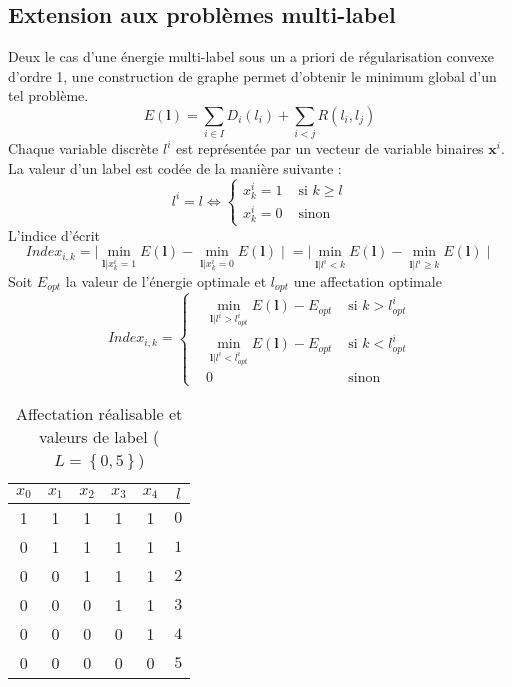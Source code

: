 \documentclass[../main/These_Mathias_Paget.tex]{subfiles}
\begin{document}
\subsection{Extension aux problèmes multi-label}

Deux le cas d'une énergie multi-label sous un a priori de régularisation convexe d'ordre 1, une construction de graphe permet d'obtenir le minimum global d'un tel problème.
	\begin{equation}
		\label{eq:Emulti}
				E(\boldsymbol{l})= \sum_{i \in I}{D_i(l_i)} + \sum_{i<j}{R(l_i,l_j)}
	\end{equation}
Chaque variable discrète $l^i$ est représentée par un vecteur de variable binaires $\boldsymbol{x}^i$. La valeur d'un label est codée de la manière suivante :
\begin{equation}
  l^i = l \Leftrightarrow \left\{
      \begin{aligned}
	x^i_k = 1 & \text{ si } k \geq l \\
	x^i_k = 0 & \text{ sinon}
      \end{aligned}
    \right.
\end{equation}
L'indice d'écrit
\begin{equation}
Index_{i,k} =  \mid \min_{\boldsymbol{l} | x^i_k =1}{E(\boldsymbol{l})} - \min_{\boldsymbol{l} | x^i_k =0}{E(\boldsymbol{l}) \mid} = \mid \min_{\boldsymbol{l} | l^i < k}{E(\boldsymbol{l})} - \min_{\boldsymbol{l} | l^i \geq k }{E(\boldsymbol{l}) \mid}
\end{equation}
Soit $E_{opt}$ la valeur de l’énergie optimale et $l_{opt}$ une affectation optimale
\begin{equation}
Index_{i,k} =  \left\{
      \begin{aligned}
	& \min_{\boldsymbol{l} | l^i > l^i_{opt}}{E(\boldsymbol{l})} - E_{opt} & \text{ si } k > l^i_{opt} \\
	& \min_{\boldsymbol{l} | l^i < l^i_{opt}}{E(\boldsymbol{l})} - E_{opt} & \text{ si } k < l^i_{opt} \\
	& 0 & \text{ sinon}
      \end{aligned}
    \right.
\end{equation}


\begin{table}
\centering
\begin{tabular}{ccccc|c}
	$x_0$ & $x_1$ & $x_2$ & $x_3$ & $x_4$ & $l$ \\
	\hline
	1 & 1 & 1 & 1 & 1 & $0$ \\
	0 & 1 & 1 & 1 & 1 & $1$ \\
	0 & 0 & 1 & 1 & 1 & $2$ \\
	0 & 0 & 0 & 1 & 1 & $3$ \\
	0 & 0 & 0 & 0 & 1 & $4$ \\
	0 & 0 & 0 & 0 & 0 & $5$ \\
\end{tabular}
	\caption{Affectation réalisable et valeurs de label ($L=\left\{0,5\right\}$)}
	\label{tab:aff_ish}
\end{table}
\end{document}

